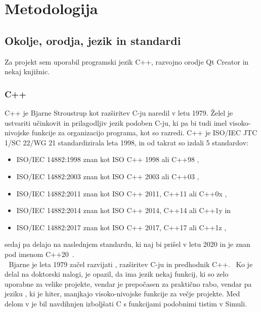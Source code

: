 \documentclass[12pt]{report}
\newcommand{\wdot}{\textcolor{white}{.}}
\newcommand{\odstavek}{\wdot \\ \wdot \qquad}
\begin{document}
\chapter{Metodologija}
\label{methods}
	\section{Okolje, orodja, jezik in standardi}
		Za projekt sem uporabil programski jezik C++, razvojno orodje Qt Creator in nekaj knjižnic.
		\subsection{C++}
			C++ je Bjarne Stroustrup kot razširitev C-ju naredil v letu 1979.
			Želel je ustvariti učinkovit in prilagodljiv jezik podoben C-ju, ki pa bi tudi imel visoko-nivojske funkcije za organizacijo programa, kot so razredi.
			C++ je ISO/IEC JTC 1/SC 22/WG 21 standardizirala leta 1998, in od takrat so izdali 5 standardov:\\
			\parbox{\textwidth}{
			\begin{itemize}
				\item ISO/IEC 14882:1998\cite{cpp98} znan kot ISO C++ 1998 ali C++98 \cite{cpp_naming,cpp_ref,cpp_evolution},
				\item ISO/IEC 14882:2003\cite{cpp03} znan kot ISO C++ 2003 ali C++03 \cite{cpp_naming,cpp_ref,cpp_evolution},
				\item ISO/IEC 14882:2011\cite{cpp11} znan kot ISO C++ 2011, C++11 ali C++0x \cite{cpp_naming,cpp_ref,cpp_evolution},
				\item ISO/IEC 14882:2014\cite{cpp14} znan kot ISO C++ 2014, C++14 ali C++1y \cite{cpp_naming,cpp_ref,cpp_evolution} in
				\item ISO/IEC 14882:2017\cite{cpp17} znan kot ISO C++ 2017, C++17 ali C++1z \cite{cpp_naming,cpp_ref,cpp_evolution},
			\end{itemize}}
			sedaj pa delajo na naslednjem standardu, ki naj bi prišel v letu 2020 in je znan pod imenom C++20~\cite{cpp_naming,cpp_ref,cpp20_naming}.
			\odstavek
			Bjarne je leta 1979 začel razvijati , razširitev C-ju in predhodnik C++.~\cite{cpp_evolution}
			Ko je delal na doktorski nalogi, je opazil, da ima jezik  nekaj funkcij, ki so zelo uporabne za velike projekte, vendar je prepočasen za praktično rabo, vendar pa jeziku , ki je hiter, manjkajo visoko-nivojske funkcije za večje projekte.
			Med delom v  je bil navdihnjen izboljšati C s funkcijami podobnimi tistim v Simuli.
\end{document}
